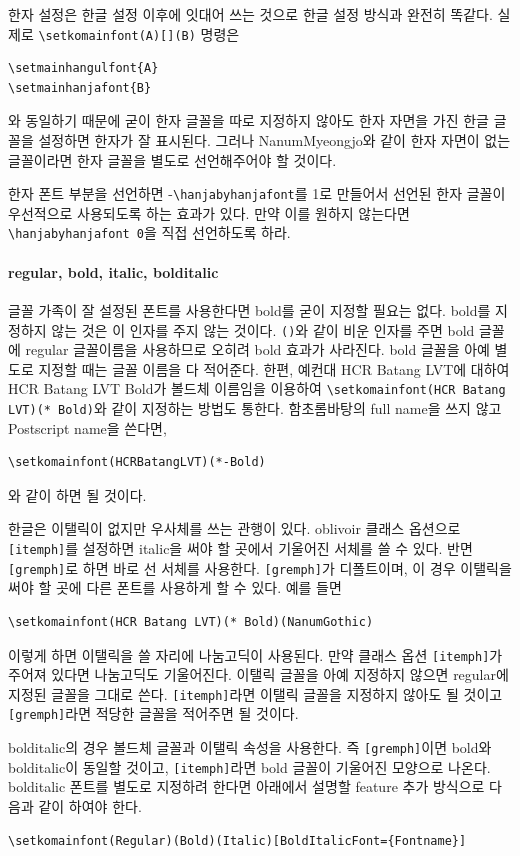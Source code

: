 \documentclass[
	12pt,
	a4paper,
	kosection,
	footnote,
	nobookmarks,
	microtype,
	figtabcapt,
]{oblivoir}
\begin{document}
한자 설정은 한글 설정 이후에 잇대어 쓰는 것으로 한글 설정 방식과 완전히 똑같다.
실제로 \verb|\setkomainfont(A)[](B)| 명령은
\begin{verbatim}
\setmainhangulfont{A}
\setmainhanjafont{B}
\end{verbatim}
와 동일하기 때문에 굳이 한자 글꼴을 따로 지정하지 않아도 한자 자면을 가진 한글 글꼴을 설정하면
한자가 잘 표시된다.
그러나 NanumMyeongjo와 같이 한자 자면이 없는 글꼴이라면 한자 글꼴을 별도로 선언해주어야 할 
것이다.

한자 폰트 부분을 선언하면 \LuaTeX- \verb|\hanjabyhanjafont|를 1로 만들어서 선언된
한자 글꼴이 우선적으로 사용되도록 하는 효과가 있다. 만약 이를 원하지 않는다면 \verb|\hanjabyhanjafont 0|을
직접 선언하도록 하라.

\paragraph{regular, bold, italic, bolditalic}
글꼴 가족이 잘 설정된 폰트를 사용한다면 bold를 굳이 지정할 필요는 없다.
bold를 지정하지 않는 것은 이 인자를 주지 않는 것이다. \verb|()|와 같이 비운 인자를 주면
bold 글꼴에 regular 글꼴이름을 사용하므로 오히려 bold 효과가 사라진다.
bold 글꼴을 아예 별도로 지정할 때는 글꼴 이름을 다 적어준다. 한편, 예컨대
HCR Batang LVT에 대하여 HCR Batang LVT Bold가 볼드체 이름임을 이용하여
\verb|\setkomainfont(HCR Batang LVT)(* Bold)|와 같이 지정하는 방법도 통한다.
함초롬바탕의 full name을 쓰지 않고 Postscript name을 쓴다면,
\begin{verbatim}
\setkomainfont(HCRBatangLVT)(*-Bold)
\end{verbatim}
와 같이 하면 될 것이다.

한글은 이탤릭이 없지만 우사체를 쓰는 관행이 있다. oblivoir 클래스 옵션으로 \texttt{[itemph]}를
설정하면 italic을 써야 할 곳에서 기울어진 서체를 쓸 수 있다. 반면 \texttt{[gremph]}로 하면
바로 선 서체를 사용한다. \texttt{[gremph]}가 디폴트이며, 이 경우 이탤릭을 써야 할 곳에 다른
폰트를 사용하게 할 수 있다. 예를 들면
\begin{verbatim}
\setkomainfont(HCR Batang LVT)(* Bold)(NanumGothic)
\end{verbatim}
이렇게 하면 이탤릭을 쓸 자리에 나눔고딕이 사용된다. 만약 클래스 옵션 \texttt{[itemph]}가
주어져 있다면 나눔고딕도 기울어진다.
이탤릭 글꼴을 아예 지정하지 않으면 regular에 지정된 글꼴을 그대로 쓴다. \texttt{[itemph]}라면
이탤릭 글꼴을 지정하지 않아도 될 것이고 \texttt{[gremph]}라면 적당한 글꼴을 적어주면 될 것이다.

bolditalic의 경우 볼드체 글꼴과 이탤릭 속성을 사용한다. 즉 \texttt{[gremph]}이면 bold와
bolditalic이 동일할 것이고, \texttt{[itemph]}라면 bold 글꼴이 기울어진 모양으로 나온다.
bolditalic 폰트를 별도로 지정하려 한다면 아래에서 설명할 feature 추가 방식으로 다음과 같이 하여야 한다.
\begin{verbatim}
\setkomainfont(Regular)(Bold)(Italic)[BoldItalicFont={Fontname}]
\end{verbatim}
\end{document}
